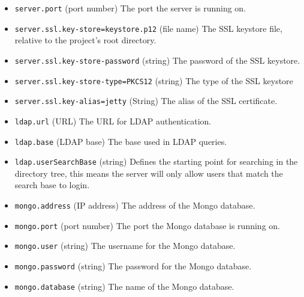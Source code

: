 \begin{itemize}
\item \verb!server.port! (port number) The port the server is running on.
\item \verb!server.ssl.key-store=keystore.p12! (file name) The SSL keystore file, relative to the project's root directory.
\item \verb!server.ssl.key-store-password! (string) The password of the SSL keystore.
\item \verb!server.ssl.key-store-type=PKCS12! (string) The type of the SSL keystore 
\item \verb!server.ssl.key-alias=jetty! (String) The alias of the SSL certificate.

\item \verb!ldap.url! (URL) The URL for LDAP authentication.
\item \verb!ldap.base! (LDAP base) The base used in LDAP queries.
\item \verb!ldap.userSearchBase! (string) Defines the starting point for searching in the directory tree, this means the server will only allow users that match the search base to login.

\item \verb!mongo.address! (IP address) The address of the Mongo database.
\item \verb!mongo.port! (port number) The port the Mongo database is running on.
\item \verb!mongo.user! (string) The username for the Mongo database.
\item \verb!mongo.password! (string) The password for the Mongo database.
\item \verb!mongo.database! (string) The name of the Mongo database.


\end{itemize}
